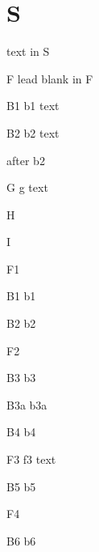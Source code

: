 \documentclass[presentation]{beamer}
\author{root}
\date{\today}
\title{}
\begin{document}
\section{S}
\label{sec:org227f491}

text in S

\begin{frame}[label={sec:org769bebc}]{F}
lead blank in F

\begin{block}{B1}
b1 text
\end{block}


\begin{block}{B2}
b2 text

after b2
\end{block}
\end{frame}

\begin{frame}[label={sec:org37a5458}]{G}
g text
\end{frame}

\begin{frame}[label={sec:org6e66c4e}]{H}
\end{frame}
\begin{frame}[label={sec:org21b02b2}]{I}
\end{frame}

\begin{frame}[label={sec:org4a6e6ac}]{F1}
\begin{block}{B1}
b1
\end{block}


\begin{block}{B2}
b2
\end{block}
\end{frame}


\begin{frame}[label={sec:orgee1f5bd}]{F2}
\begin{block}{B3}
b3

\begin{block}{B3a}
b3a
\end{block}
\end{block}

\begin{block}{B4}
b4
\end{block}
\end{frame}
\begin{frame}[label={sec:org1ee00b9}]{F3}
f3 text

\begin{block}{B5}
b5
\end{block}
\end{frame}
\begin{frame}[label={sec:orgaaa91f2}]{F4}
\begin{block}{B6}
b6
\end{block}
\end{frame}
\end{document}
